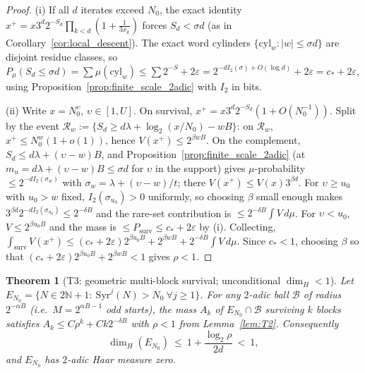 \documentclass[12pt,a4paper]{article}
\newtheorem{theorem}{Theorem}[section]
\begin{document}
\begin{proof}
(i) If all $d$ iterates exceed $N_0$, the exact identity
$x^+=x3^d2^{-S_d}\prod_{k<d}(1+\tfrac1{3x_k})$ forces
$S_d<\sigma d$ (as in Corollary~\ref{cor:local_descent}). The exact word
cylinders $\{\mathrm{cyl}_w:|w|\le\sigma d\}$ are disjoint residue classes, so
$P_\mu(S_d\le\sigma d)=\sum\mu(\mathrm{cyl}_w)\le\sum2^{-S}+2\varepsilon
=2^{-dI_2(\sigma)+O(\log d)}+2\varepsilon=c_*+2\varepsilon$,
using Proposition~\ref{prop:finite_scale_2adic} with $I_2$ in bits.

(ii) Write $x=N_0^{\upsilon}$, $\upsilon\in[1,U]$. On survival,
$x^+=x3^d2^{-S_d}(1+O(N_0^{-1}))$. Split by the event
$\mathcal R_w:=\{S_d\ge d\lambda+\log_2(x/N_0)-wB\}$: on $\mathcal R_w$,
$x^+\le N_0^{w}(1+o(1))$, hence $V(x^+)\le2^{\beta wB}$. On the complement,
$S_d\le d\lambda+(\upsilon-w)B$, and Proposition~\ref{prop:finite_scale_2adic}
(at $m_u=d\lambda+(\upsilon-w)B\le\sigma d$ for $\upsilon$ in the support) gives
$\mu$-probability $\le2^{-dI_2(\sigma_w)}$ with
$\sigma_w=\lambda+(\upsilon-w)/t$; there $V(x^+)\le V(x)3^{\beta d}$.
For $\upsilon\ge u_0$ with $u_0>w$ fixed, $I_2(\sigma_{u_0})>0$ uniformly, so
choosing $\beta$ small enough makes $3^{\beta d}2^{-dI_2(\sigma_{u_0})}\le2^{-\delta B}$
and the rare-set contribution is $\le2^{-\delta B}\int V\,d\mu$. For
$\upsilon<u_0$, $V\le2^{\beta u_0B}$ and the mass is $\le P_{\mathrm{surv}}\le c_*+2\varepsilon$
by (i). Collecting,
$\int_{\mathrm{surv}}V(x^+)\le(c_*+2\varepsilon)2^{\beta u_0B}+2^{\beta wB}+2^{-\delta B}\int V\,d\mu$.
Since $c_*<1$, choosing $\beta$ so that
$(c_*+2\varepsilon)2^{\beta u_0B}+2^{\beta wB}<1$ gives $\rho<1$.
\end{proof}

\begin{theorem}[T3: geometric multi-block survival; unconditional $\dim_H<1$]
\label{thm:T3}
Let $E_{N_0}=\{N\in2\mathbb{N}+1:\ \mathrm{Syr}^j(N)>N_0\ \forall j\ge1\}$.
For any $2$-adic ball $\mathcal B$ of radius $2^{-\alpha B}$ (i.e.\
$M=2^{\alpha B-1}$ odd starts), the mass $A_k$ of $E_{N_0}\cap\mathcal B$
surviving $k$ blocks satisfies
$A_k\le C\rho^k+Ck2^{-\delta B}$ with $\rho<1$ from Lemma~\ref{lem:T2}.
Consequently
\[
\dim_H(E_{N_0})\ \le\ 1+\frac{\log_2\rho}{2d}\ <\ 1,
\]
and $E_{N_0}$ has $2$-adic Haar measure zero.
\end{theorem}
\end{document}
